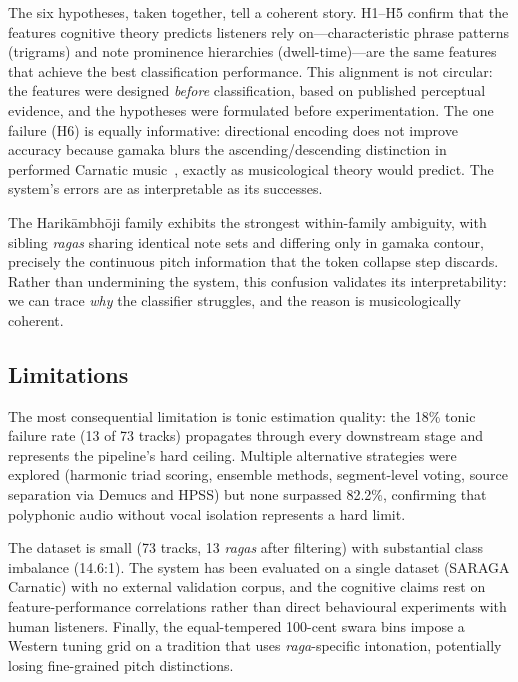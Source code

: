 \documentclass[11pt,a4paper]{article}
\begin{document}
{The six hypotheses, taken together, tell a coherent story. H1--H5 confirm that the features cognitive theory predicts listeners rely on---characteristic phrase patterns (trigrams) and note prominence hierarchies (dwell-time)---are the same features that achieve the best classification performance. This alignment is not circular: the features were designed \textit{before} classification, based on published perceptual evidence, and the hypotheses were formulated before experimentation. The one failure (H6) is equally informative: directional encoding does not improve accuracy because gamaka blurs the ascending/descending distinction in performed Carnatic music~\cite{krishnaswamy2003}, exactly as musicological theory would predict. The system's errors are as interpretable as its successes.

The Harik\=ambh\=oji family exhibits the strongest within-family ambiguity, with sibling \textit{ragas} sharing identical note sets and differing only in gamaka contour, precisely the continuous pitch information that the token collapse step discards. Rather than undermining the system, this confusion validates its interpretability: we can trace \textit{why} the classifier struggles, and the reason is musicologically coherent.

\subsection{Limitations}

The most consequential limitation is tonic estimation quality: the 18\% tonic failure rate (13 of 73 tracks) propagates through every downstream stage and represents the pipeline's hard ceiling. Multiple alternative strategies were explored (harmonic triad scoring, ensemble methods, segment-level voting, source separation via Demucs and HPSS) but none surpassed 82.2\%, confirming that polyphonic audio without vocal isolation represents a hard limit.

The dataset is small (73 tracks, 13 \textit{ragas} after filtering) with substantial class imbalance (14.6:1). The system has been evaluated on a single dataset (SARAGA Carnatic) with no external validation corpus, and the cognitive claims rest on feature-performance correlations rather than direct behavioural experiments with human listeners. Finally, the equal-tempered 100-cent swara bins impose a Western tuning grid on a tradition that uses \textit{raga}-specific intonation, potentially losing fine-grained pitch distinctions.

}
\end{document}
